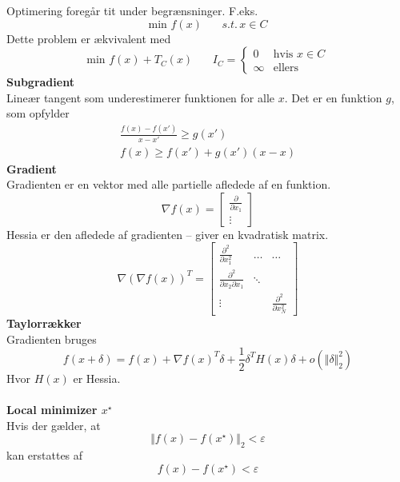 \documentclass[12pt,a4paper]{report}
\author{Frederik Appel Vardinghus-Nielsen}
\begin{document}
\noindent Optimering foregår tit under begrænsninger. F.eks.
\begin{equation}
\text{min }f(x)\phantom{mm}s.t.\,x\in C
\end{equation}
Dette problem er ækvivalent med
\begin{equation}
\text{min }f(x)+T_C(x)\phantom{mm}I_C=\begin{cases}0&\text{hvis }x\in C\\
\infty&\text{ellers}\end{cases}
\end{equation}
\textbf{Subgradient}\\
Lineær tangent som underestimerer funktionen for alle $x$. Det er en funktion $g$, som opfylder
\begin{align*}
\frac{f(x)-f(x')}{x-x'}\geq g(x')\\
f(x)\geq f(x')+g(x')(x-x)
\end{align*}
\textbf{Gradient}\\
Gradienten er en vektor med alle partielle afledede af en funktion.
\begin{equation}
\nabla f(x)=\begin{bmatrix}\frac{\partial}{\partial x_1}\\ \vdots\end{bmatrix}
\end{equation}
Hessia er den afledede af gradienten -- giver en kvadratisk matrix.
\begin{equation}
\nabla(\nabla f(x))^T=\begin{bmatrix}\frac{\partial^2}{\partial x_1^2}&\hdots&\hdots\\
\frac{\partial^2}{\partial x_2\partial x_1}&\ddots& \\ \vdots & &\frac{\partial^2}{\partial x_N^2}\end{bmatrix}
\end{equation}
\textbf{Taylorrækker}\\
Gradienten bruges
\begin{equation}
f(x+\delta)=f(x)+\nabla f(x)^T\delta+\frac{1}{2}\delta^TH(x)\delta+o(\Vert\delta\Vert_2^2)
\end{equation}
Hvor $H(x)$ er Hessia.\\\\
\textbf{Local minimizer $x^{\star}$}\\
Hvis der gælder, at
\begin{equation}
\Vert f(x)-f(x^{\star})\Vert_2<\varepsilon
\end{equation}
kan erstattes af
\begin{equation}
f(x)-f(x^{\star})<\varepsilon
\end{equation}
\end{document}
